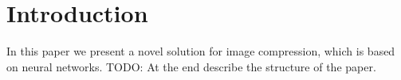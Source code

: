 
\section{Introduction}

In this paper we present a novel solution for image compression, which is based on neural networks. 
\newline
TODO: At the end describe the structure of the paper.